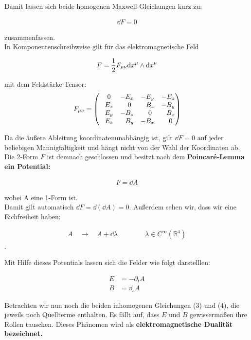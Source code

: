 Damit lassen sich beide homogenen Maxwell-Gleichungen kurz zu: 

\begin{align}
\dd F = 0
\end{align}

zusammenfassen. \\
In Komponentenschreibweise gilt für das elektromagnetische Feld

\begin{align}
F = \frac{1}{2} F_{\mu \nu} \dd x^{\mu} \wedge \dd x^{\nu}
\end{align}

mit dem Feldstärke-Tensor:
\begin{align}
F_{\mu \nu} =
\begin{pmatrix}
\phantom{-}0 & -E_x & -E_y & -E_z \\
\phantom{-}E_x & \phantom{-}0 & \phantom{-}B_z & -B_y \\
\phantom{-}E_y & -B_z & \phantom{-}0 & \phantom{-}B_x \\
\phantom{-}E_z & \phantom{-}B_y & -B_x & \phantom{-}0
\end{pmatrix}
\end{align}

Da die äußere Ableitung koordinatenunabhängig ist, gilt $\dd F = 0$ auf jeder beliebigen Mannigfaltigkeit und hängt nicht von der Wahl der Koordinaten ab. \\
Die 2-Form $F$ ist demnach geschlossen und besitzt nach dem \bfseries Poincaré-Lemma \normalfont ein Potential:

\begin{align}
F = \dd A 
\end{align}

wobei A eine 1-Form ist. \\
Damit gilt automatisch $ \dd F = \dd (\dd A) = 0$. Außerdem sehen wir, dass wir eine Eichfreiheit haben:

\begin{align}
A \quad \rightarrow \quad A + \dd \lambda \qquad\qquad \lambda \in C^{\infty}(\mathbb{R}^4)
\end{align}.

Mit Hilfe dieses Potentials lassen sich die Felder wie folgt darstelllen:

\begin{align}
E &= -\partial_t A \\
B &= \dd_s A
\end{align}

Betrachten wir nun noch die beiden inhomogenen Gleichungen (3) und (4), die jeweils noch Quellterme enthalten. Es fällt auf, dass $E$ und $B$ gewissermaßen ihre Rollen tauschen. Dieses Phänomen wird als \bfseries elektromagnetische Dualität \normalfont bezeichnet.

